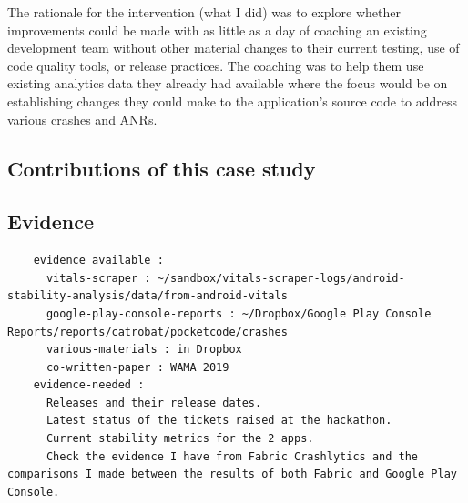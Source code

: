 The rationale for the intervention (what I did) was to explore whether improvements could be made with as little as a day of coaching an existing development team without other material changes to their current testing, use of code quality tools, or release practices. The coaching was to help them use existing analytics data they already had available where the focus would be on establishing changes they could make to the application's source code to address various crashes and ANRs.

\subsection*{Contributions of this case study}





\subsection*{Evidence}
  \begin{verbatim}
    evidence available :
      vitals-scraper : ~/sandbox/vitals-scraper-logs/android-stability-analysis/data/from-android-vitals
      google-play-console-reports : ~/Dropbox/Google Play Console Reports/reports/catrobat/pocketcode/crashes
      various-materials : in Dropbox
      co-written-paper : WAMA 2019
    evidence-needed : 
      Releases and their release dates.
      Latest status of the tickets raised at the hackathon.
      Current stability metrics for the 2 apps.
      Check the evidence I have from Fabric Crashlytics and the comparisons I made between the results of both Fabric and Google Play Console.
  \end{verbatim}



